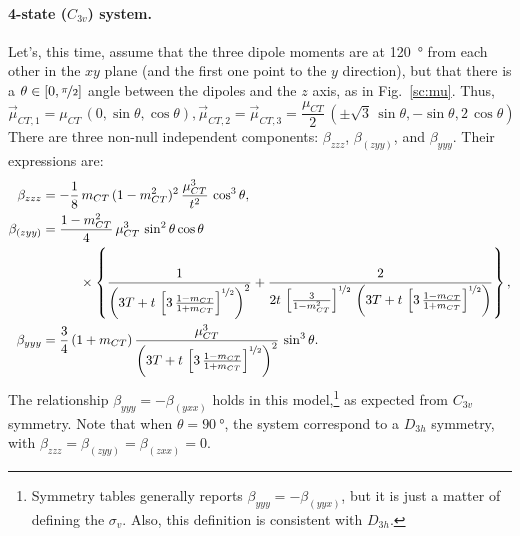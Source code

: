 \documentclass[12pt,a4paper]{article}
\begin{document}
\paragraph{4-state ($C_{3v}$) system.} Let's, this time, assume that the three dipole moments are at \SI{120}{\degree} from each other in the $xy$ plane (and the first one point to the $y$ direction), but that there is a $\theta\in[0,\nicefrac{\pi}{2}]$ angle between the dipoles and the $z$ axis, as in Fig.~\ref{sc:mu}. Thus,\begin{equation}
	\vec\mu_{CT,1} = \mu_{CT}\,(0,\sin\theta,\cos\theta), \vec\mu_{CT,2} = \vec\mu_{CT,3} = \frac{\mu_{CT}}{2}\,(\pm\sqrt{3}\,\sin\theta, -\sin\theta, 2\,\cos\theta)
\end{equation}
There are three non-null independent components: $\beta_{zzz}$,  $\beta_{(zyy)}$, and $\beta_{yyy}$. Their expressions are:\begin{align}
	\beta_{zzz} &= -\frac{1}{8}\,m_{CT}\,(1-m_{CT}^2)^2\,\frac{\mu^3_{CT}}{t^2}\,\cos^3\theta,\nonumber\\
	\beta_{(zyy)} &= \frac{1-m_{CT}^2}{4}\,\mu_{CT}^3\,\sin^2\theta\cos\theta\nonumber\\
	&\hspace{1cm}\times\left\{\frac{1}{\left(3T + t\,\left[3\,\frac{1-m_{CT}}{1+m_{CT}}\right]^{\nicefrac{1}{2}}\right)^2} + \frac{2}{2t\,\left[\frac{3}{1-m_{CT}^2}\right]^{\nicefrac{1}{2}}\,\left(3T + t\,\left[3\,\frac{1-m_{CT}}{1+m_{CT}}\right]^{\nicefrac{1}{2}}\right)}\right\},\nonumber\\
	\beta_{yyy} &= \frac{3}{4}\,(1+m_{CT})\,\frac{\mu_{CT}^3}{\left(3T + t\,\left[3\,\frac{1-m_{CT}}{1+m_{CT}}\right]^{\nicefrac{1}{2}}\right)^2}\,\sin^3\theta.\label{eq:4state}
\end{align}
The relationship $\beta_{yyy} = -\beta_{(yxx)}$ holds in this model,\footnote{Symmetry tables generally reports  $\beta_{yyy} = -\beta_{(yyx)}$, but it is just a matter of defining the $\sigma_v$. Also, this definition is consistent with $D_{3h}$.} as expected from $C_{3v}$ symmetry. Note that when $\theta=\SI{90}{°}$, the system correspond to a $D_{3h}$ symmetry, with $\beta_{zzz} = \beta_{(zyy)} = \beta_{(zxx)} = 0$.
\end{document}
